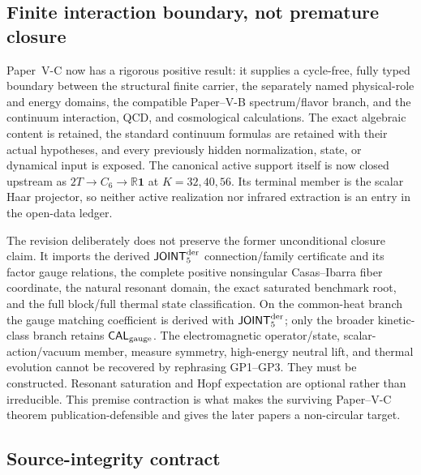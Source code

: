 \documentclass[12pt,a4paper]{article}
\newcommand{\JOINTfiveocc}{\mathsf{JOINT}_{5}^{\rm der}}
\newcommand{\CALgauge}{\mathsf{CAL}_{\rm gauge}}
\begin{document}
\subsection{Finite interaction boundary, not premature closure}
\label{p7v2:sec:conclusion}

Paper~V-C now has a rigorous positive result: it supplies a cycle-free,
fully typed boundary between the structural finite carrier, the separately
named physical-role and energy domains, the compatible Paper--V-B
spectrum/flavor branch, and the continuum
interaction, QCD, and cosmological calculations.  The exact algebraic
content is retained, the standard continuum formulas are retained with their
actual hypotheses, and every previously hidden normalization, state, or
dynamical input is exposed.  The canonical active support itself is now
closed upstream as \(2T\to C_6\to\mathbb R\mathbf1\) at
\(K=32,40,56\).  Its terminal member is the scalar Haar projector, so neither
active realization nor infrared extraction is an entry in the open-data
ledger.

The revision deliberately does not preserve the former unconditional closure
claim.  It imports the derived \(\JOINTfiveocc\) connection/family certificate
and its factor gauge relations, the complete positive nonsingular
Casas--Ibarra fiber coordinate, the natural resonant domain, the exact
saturated benchmark root, and the full block/full thermal state
classification.  On the common-heat branch the gauge matching coefficient is
derived with \(\JOINTfiveocc\); only the broader kinetic-class branch retains
\(\CALgauge\).  The electromagnetic operator/state, scalar-action/vacuum
member, measure symmetry, high-energy
neutral lift, and thermal evolution cannot be recovered by rephrasing
GP1--GP3.  They must be constructed.  Resonant saturation and Hopf expectation
are optional rather than irreducible.  This premise contraction
is what makes the surviving Paper--V-C theorem publication-defensible and
gives the later papers a non-circular target.



\subsection{Source-integrity contract}
\label{p7v2:app:source-integrity}
\end{document}
